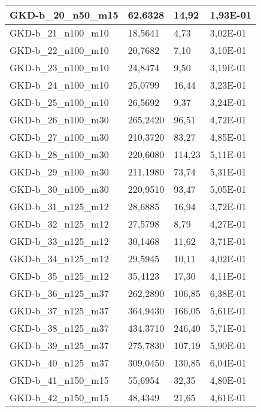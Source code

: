 \begin{table}[!ht]
\begin{adjustbox}{height=12cm}
\begin{tabular}{|l|l|l|l|}
        GKD-b\_20\_n50\_m15  & 62,6328  & 14,92         & 1,93E-01 \\ \hline
        GKD-b\_21\_n100\_m10 & 18,5641  & 4,73          & 3,02E-01 \\ \hline
        GKD-b\_22\_n100\_m10 & 20,7682  & 7,10          & 3,10E-01 \\ \hline
        GKD-b\_23\_n100\_m10 & 24,8474  & 9,50          & 3,19E-01 \\ \hline
        GKD-b\_24\_n100\_m10 & 25,0799  & 16,44         & 3,23E-01 \\ \hline
        GKD-b\_25\_n100\_m10 & 26,5692  & 9,37          & 3,24E-01 \\ \hline
        GKD-b\_26\_n100\_m30 & 265,2420 & 96,51         & 4,72E-01 \\ \hline
        GKD-b\_27\_n100\_m30 & 210,3720 & 83,27         & 4,85E-01 \\ \hline
        GKD-b\_28\_n100\_m30 & 220,6080 & 114,23        & 5,11E-01 \\ \hline
        GKD-b\_29\_n100\_m30 & 211,1980 & 73,74         & 5,31E-01 \\ \hline
        GKD-b\_30\_n100\_m30 & 220,9510 & 93,47         & 5,05E-01 \\ \hline
        GKD-b\_31\_n125\_m12 & 28,6885  & 16,94         & 3,72E-01 \\ \hline
        GKD-b\_32\_n125\_m12 & 27,5798  & 8,79          & 4,27E-01 \\ \hline
        GKD-b\_33\_n125\_m12 & 30,1468  & 11,62         & 3,71E-01 \\ \hline
        GKD-b\_34\_n125\_m12 & 29,5945  & 10,11         & 4,02E-01 \\ \hline
        GKD-b\_35\_n125\_m12 & 35,4123  & 17,30         & 4,11E-01 \\ \hline
        GKD-b\_36\_n125\_m37 & 262,2890 & 106,85        & 6,38E-01 \\ \hline
        GKD-b\_37\_n125\_m37 & 364,9430 & 166,05        & 5,61E-01 \\ \hline
        GKD-b\_38\_n125\_m37 & 434,3710 & 246,40        & 5,71E-01 \\ \hline
        GKD-b\_39\_n125\_m37 & 275,7830 & 107,19        & 5,90E-01 \\ \hline
        GKD-b\_40\_n125\_m37 & 309,0450 & 130,85        & 6,04E-01 \\ \hline
        GKD-b\_41\_n150\_m15 & 55,6954  & 32,35         & 4,80E-01 \\ \hline
        GKD-b\_42\_n150\_m15 & 48,4349  & 21,65         & 4,61E-01 \\ \hline

\end{tabular}
\end{adjustbox}
\end{table}
